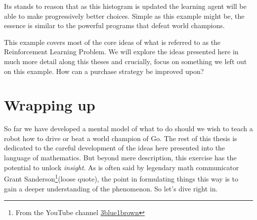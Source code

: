 Its stands to reason that as this histogram is updated the 
learning agent will be able to make progressively better 
choices. Simple as this example might be, the essence is 
similar to the powerful programs that defeat world champions.

This example covers most of the core ideas of what is referred 
to as the Reinforcement Learning Problem. We will explore the 
ideas presented here in much more detail along this theses and 
crucially, focus on something we left out on this example. How 
can a purchase strategy be improved upon?

\section{Wrapping up}
So far we have developed a mental model of what to do should we 
wish to teach a robot how to drive or beat a world champion of 
Go. The rest of this thesis is dedicated to the careful 
development of the ideas here presented into the language of 
mathematics.  But beyond mere description, this exercise has 
the potential to unlock \textit{insight}. As is often said by 
legendary math communicator Grant Sanderson\footnote{From the 
YouTube channel 
\href{https://www.youtube.com/channel/UCYO_jab_esuFRV4b17AJtAw}{3blue1brown}}(loose 
quote), the point in formulating things this way is to gain a 
deeper understanding of the phenomenon. So let's dive right in.
